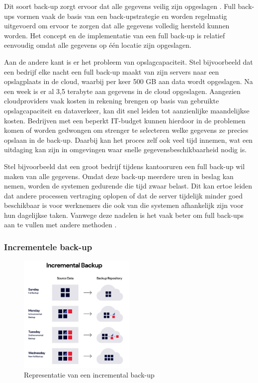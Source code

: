 Dit soort back-up zorgt ervoor dat alle gegevens veilig zijn opgeslagen \autocite{Chervenak1998}. Full back-ups vormen vaak de basis van een back-upstrategie en worden regelmatig uitgevoerd om ervoor te zorgen dat alle gegevens volledig hersteld kunnen worden. Het concept en de implementatie van een full back-up is relatief eenvoudig omdat alle gegevens op één locatie zijn opgeslagen. 

Aan de andere kant is er het probleem van opslagcapaciteit. Stel bijvoorbeeld dat een bedrijf elke nacht een full back-up maakt van zijn servers naar een opslagplaats in de cloud, waarbij per keer 500 GB aan data wordt opgeslagen. Na een week is er al 3,5 terabyte aan gegevens in de cloud opgeslagen. Aangezien cloudproviders vaak kosten in rekening brengen op basis van gebruikte opslagcapaciteit en dataverkeer, kan dit snel leiden tot aanzienlijke maandelijkse kosten. Bedrijven met een beperkt IT-budget kunnen hierdoor in de problemen komen of worden gedwongen om strenger te selecteren welke gegevens ze precies opslaan in de back-up. Daarbij kan het proces zelf ook veel tijd innemen, wat een uitdaging kan zijn in omgevingen waar snelle gegevensbeschikbaarheid nodig is.  

Stel bijvoorbeeld dat een groot bedrijf tijdens kantooruren een full back-up wil maken van alle gegevens. Omdat deze back-up meerdere uren in beslag kan nemen, worden de systemen gedurende die tijd zwaar belast. Dit kan ertoe leiden dat andere processen vertraging oplopen of dat de server tijdelijk minder goed beschikbaar is voor werknemers die ook van die systemen afhankelijk zijn voor hun dagelijkse taken. Vanwege deze nadelen is het vaak beter om full back-ups aan te vullen met andere methoden \autocite{Nelson2011}.

\subsubsection{Incrementele back-up}
\begin{figure}[h] 
    \centering
    \captionsetup{justification=centering}
    \includegraphics[width=0.5\textwidth]{img/incrementb.png}  
    \caption{Representatie van een incremental back-up \autocite{Rivas2022}}   
    \label{fig:incrback-up}           
\end{figure}

